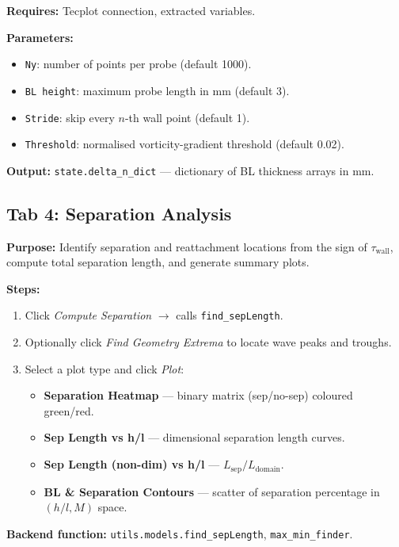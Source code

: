\documentclass[11pt,letterpaper]{article}
\begin{document}
\textbf{Requires:} Tecplot connection, extracted variables.

\textbf{Parameters:}
\begin{itemize}
  \item \texttt{Ny}: number of points per probe (default 1000).
  \item \texttt{BL height}: maximum probe length in mm (default 3).
  \item \texttt{Stride}: skip every $n$-th wall point (default 1).
  \item \texttt{Threshold}: normalised vorticity-gradient threshold (default 0.02).
\end{itemize}

\textbf{Output:} \texttt{state.delta\_n\_dict} — dictionary of BL thickness
arrays in mm.

\subsection{Tab 4: Separation Analysis}

\textbf{Purpose:} Identify separation and reattachment locations from the sign
of $\tau_{\text{wall}}$, compute total separation length, and generate summary
plots.

\textbf{Steps:}
\begin{enumerate}
  \item Click \emph{Compute Separation} $\rightarrow$ calls
        \texttt{find\_sepLength}.
  \item Optionally click \emph{Find Geometry Extrema} to locate wave peaks
        and troughs.
  \item Select a plot type and click \emph{Plot}:
    \begin{itemize}
      \item \textbf{Separation Heatmap} — binary matrix (sep/no-sep) coloured
            green/red.
      \item \textbf{Sep Length vs h/l} — dimensional separation length curves.
      \item \textbf{Sep Length (non-dim) vs h/l} — $L_{\text{sep}}/L_{\text{domain}}$.
      \item \textbf{BL \& Separation Contours} — scatter of separation
            percentage in $(h/l, M)$ space.
    \end{itemize}
\end{enumerate}

\textbf{Backend function:} \texttt{utils.models.find\_sepLength},
\texttt{max\_min\_finder}.
\end{document}
